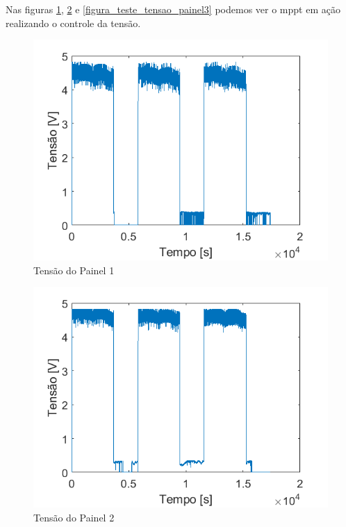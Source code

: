Nas figuras \ref{figura_teste_tensao_painel1}, \ref{figura_teste_tensao_painel2} e \ref{figura_teste_tensao_painel3} podemos ver o \gls{mppt} em ação realizando o controle da tensão.

\begin{figure}[!htpb]
\begin{center}
\includegraphics[scale=0.5]{figures/testPanel1Voltage.png}
\caption{Tensão do Painel 1}
\label{figura_teste_tensao_painel1}
\end{center}
\end{figure}

\begin{figure}[!htpb]
\begin{center}
\includegraphics[scale=0.5]{figures/testPanel2Voltage.png}
\caption{Tensão do Painel 2}
\label{figura_teste_tensao_painel2}
\end{center}
\end{figure}


